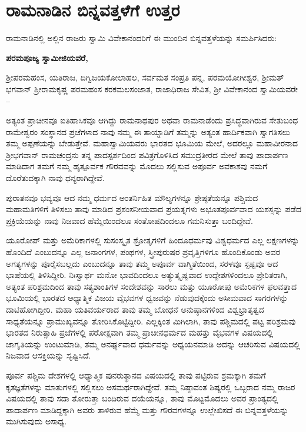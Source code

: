 
\chapter{ರಾಮನಾಡಿನ ಬಿನ್ನವತ್ತಳೆಗೆ ಉತ್ತರ}

ರಾಮನಾಡಿನಲ್ಲಿ ಅಲ್ಲಿನ ರಾಜರು ಸ್ವಾಮಿ ವಿವೇಕಾನಂದರಿಗೆ ಈ ಮುಂದಿನ ಬಿನ್ನವತ್ತಳೆಯನ್ನು ಸಮರ್ಪಿಸಿದರು:

\textbf{ಪರಮಪೂಜ್ಯ ಸ್ವಾಮೀಜಿಯವರೆ, }

ಶ‍್ರೀಪರಮಹಂಸ, ಯತಿರಾಜ, ದಿಗ್ವಿಜಯಕೋಲಾಹಲ, ಸರ್ವಮತ ಸಂಪ್ರತಿ ಪನ್ನ, ಪರಮಯೋಗೀಶ್ವರ, ಶ‍್ರೀಮತ್​ ಭಗವಾನ್​ ಶ‍್ರೀರಾಮಕೃಷ್ಣ ಪರಮಹಂಸ ಕರಕಮಲಸಂಜಾತ, ರಾಜಾಧಿರಾಜ ಸೇವಿತ, ಶ‍್ರೀ ವಿವೇಕಾನಂದ ಸ್ವಾಮಿಯವರೇ –

ಅತ್ಯಂತ ಪ್ರಾಚೀನವೂ ಐತಿಹಾಸಿಕವೂ ಆಗಿದ್ದು ರಾಮನಾಥಪುರ ಅಥವಾ ರಾಮನಾಡೆಂದು ಪ್ರಸಿದ್ಧವಾಗಿರುವ ಸೇತುಬಂಧ ರಾಮೇಶ್ವರಂ ಸಂಸ್ಥಾನದ ಪ್ರಜೆಗಳಾದ ನಾವು ನಮ್ಮ ಈ ತಾಯ್ನಾಡಿಗೆ ತಮ್ಮನ್ನು ಅತ್ಯಂತ ಹಾರ್ದಿಕವಾಗಿ ಸ್ವಾಗತಿಸಲು ತಮ್ಮ ಅಪ್ಪಣೆಯನ್ನು ಬೇಡುತ್ತೇವೆ. ಮಹಾಸ್ವಾಮಿಯವರು ಭಾರತದ ಭೂಮಿಯ ಮೇಲೆ, ಅದರಲ್ಲೂ ಮಹಾವೀರನಾದ ಶ‍್ರೀಭಗವಾನ್​ ರಾಮಚಂದ್ರನು ತನ್ನ ಪಾದಸ್ಪರ್ಶದಿಂದ ಪವಿತ್ರಗೊಳಿಸಿದ ಸಮುದ್ರತೀರದ ಮೇಲೆ ತಾವು ಪಾದಾರ್ಪಣ ಮಾಡಿದಾಗ ತಮಗೆ ನಮ್ಮ ಹೃತ್ಪೂರ್ವಕ ಗೌರವವನ್ನು ಮೊದಲು ಸಲ್ಲಿಸುವ ಅಪೂರ್ವ ಅವಕಾಶವು ನಮಗೆ ದೊರೆತುದಕ್ಕಾಗಿ ನಾವು ಧನ್ಯರಾಗಿದ್ದೇವೆ. 

ಪುರಾತನವೂ ಭವ್ಯವೂ ಆದ ನಮ್ಮ ಧರ್ಮದ ಅಂತರ್ನಿಹಿತ ಮೌಲ್ಯಗಳನ್ನೂ ಶ್ರೇಷ್ಠತೆಯನ್ನೂ ಪಶ್ಚಿಮದ ಮಹಾಮತಿಗಳಿಗೆ ತಿಳಿಸಲು ತಾವು ಮಾಡಿದ ಪ್ರಶಂಸನೀಯವಾದ ಪ್ರಯತ್ನಗಳು ಅಭೂತಪೂರ್ವವಾದ ಯಶಸ್ಸನ್ನು ಪಡೆದ ಪ್ರಕ್ರಿಯೆಯನ್ನು ನಾವು ನಿಜವಾದ ಹೆಮ್ಮೆಯಿಂದಲೂ ಸಂತೋಷದಿಂದಲೂ ಗಮನಿಸುತ್ತಾ ಬಂದಿದ್ದೇವೆ. 

ಯೂರೋಪ್​ ಮತ್ತು ಅಮೆರಿಕಾಗಳಲ್ಲಿ ಸುಸಂಸ್ಕೃತ ಶ್ರೋತೃಗಳಿಗೆ ಹಿಂದೂಧರ್ಮವು ವಿಶ್ವಧರ್ಮದ ಎಲ್ಲ ಲಕ್ಷಣಗಳನ್ನು ಹೊಂದಿದೆ ಎಂಬುದನ್ನೂ ಎಲ್ಲ ಜನಾಂಗಗಳ, ಪಂಥಗಳ, ಸ್ತ್ರೀಪುರುಷರ ಪ್ರವೃತ್ತಿಗಳಿಗೂ ಹೊಂದಿಕೊಂಡು ಅವರ ಅಗತ್ಯಗಳನ್ನು ಪೂರೈಸಬಲ್ಲದು ಎಂಬುದನ್ನೂ ತಾವು ತಮ್ಮ ಅಪೂರ್ವ ವಾಗ್ಮಿತೆಯಿಂದ, ಸರಳವೂ ಸ್ಪಷ್ಟವೂ ಆದ ಭಾಷೆಯಲ್ಲಿ ತಿಳಿಸಿದ್ದೀರಿ. ನಿಃಸ್ವಾರ್ಥ ಮನೋ ಭಾವದಿಂದಲೂ ಅತ್ಯುತ್ಕೃಷ್ಟವಾದ ಉದ್ದೇಶಗಳಿಂದಲೂ ಪ್ರೇರಿತರಾಗಿ, ಅತ್ಯಂತ ಪರಿಶ್ರಮದಿಂದ ತಾವು ಸತ್ಯಶಾಂತಿಗಳ ಸಂದೇಶವನ್ನು ಸಾರಲು ಮತ್ತು ಯೂರೋಪು ಅಮೆರಿಕಗಳ ಫಲವತ್ತಾದ ಭೂಮಿಯಲ್ಲಿ ಭಾರತದ ಆಧ್ಯಾತ್ಮಿಕ ವಿಜಯ ವೈಭವಗಳ ಧ್ವಜವನ್ನು ನೆಡುವುದಕ್ಕೆಂದು ಅಸೀಮವಾದ ಸಾಗರಗಳನ್ನು ದಾಟಿಹೋಗಿದ್ದೀರಿ. ಮಹಾ ಯತಿವರ್ಯರಾದ ತಾವು ತಮ್ಮ ಬೋಧನೆ ಅನುಷ್ಠಾನಗಳಿಂದ ವಿಶ್ವಭ್ರಾತೃತ್ವದ ಸಾಧ್ಯತೆಯನ್ನೂ ಪ್ರಾಮುಖ್ಯವನ್ನೂ ತೋರಿಸಿಕೊಟ್ಟಿದ್ದೀರಿ. ಎಲ್ಲಕ್ಕಿಂತ ಮಿಗಿಲಾಗಿ, ತಾವು ಪಶ್ಚಿಮದಲ್ಲಿ ಪಟ್ಟ ಪರಿಶ್ರಮವು ಭಾರತದ ನಿರುತ್ಸಾಹಿ ಪ್ರಜೆಗಳಲ್ಲಿ ಪರೋಕ್ಷವಾಗಿ ತಮ್ಮ ಪ್ರಾಚೀನಧರ್ಮದ ಮಹತ್ತು ವೈಭವಗಳ ವಿಷಯದಲ್ಲಿ ಜಾಗೃತಿಯನ್ನು ಉಂಟುಮಾಡಿ, ತಮ್ಮ ಅನರ್ಘ್ಯವಾದ ಧರ್ಮವನ್ನು ಅಧ್ಯಯನಮಾಡಿ ಅದನ್ನು ಆಚರಿಸುವ ವಿಷಯದಲ್ಲಿ ನಿಜವಾದ ಆಸಕ್ತಿಯನ್ನು ಸೃಷ್ಟಿಸಿದೆ. 

ಪೂರ್ವ ಪಶ್ಚಿಮ ದೇಶಗಳಲ್ಲಿ ಆಧ್ಯಾತ್ಮಿಕ ಪುನರುತ್ಥಾನದ ವಿಷಯದಲ್ಲಿ ತಾವು ಪಟ್ಟಿರುವ ಶ್ರಮಕ್ಕಾಗಿ ತಮಗೆ ಕೃತಜ್ಞತೆಗಳನ್ನು ಮಾತುಗಳಲ್ಲಿ ಸಲ್ಲಿಸಲು ಅಸಮರ್ಥರಾಗಿದ್ದೇವೆ. ತಮ್ಮ ನಿಷ್ಠಾವಂತ ಶಿಷ್ಯರಲ್ಲಿ ಒಬ್ಬರಾದ ನಮ್ಮ ರಾಜರ ವಿಷಯದಲ್ಲಿ ತಾವು ಸದಾ ತೋರುತ್ತಾ ಬಂದಿರುವ ದಯೆಯನ್ನೂ, ತಾವು ಮೊಟ್ಟಮೊದಲು ಅವರ ಪ್ರಾಂತ್ಯದಲ್ಲಿ ಪಾದಾರ್ಪಣ ಮಾಡಿದ್ದಕ್ಕಾಗಿ ಅವರು ತಾಳಿರುವ ಹೆಮ್ಮೆ ಮತ್ತು ಗೌರವಗಳನ್ನೂ ಉಲ್ಲೇಖಿಸದೆ ಈ ಬಿನ್ನವತ್ತಳೆಯನ್ನು ಮುಗಿಸುವುದು ಅಸಾಧ್ಯ. 


